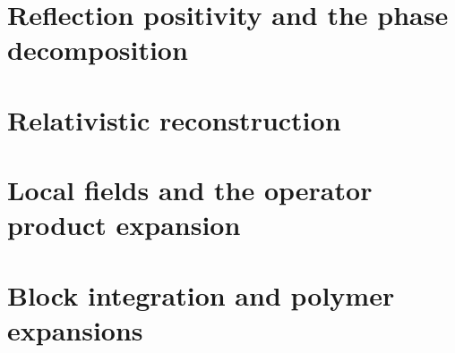 \documentclass[11pt]{article}
\theoremstyle{remark}
\numberwithin{equation}{section}
\begin{document}
\section{Reflection positivity and the phase decomposition}








\section{Relativistic reconstruction}











\section{Local fields and the operator product expansion}












\section{Block integration and polymer expansions}


































\end{document}
